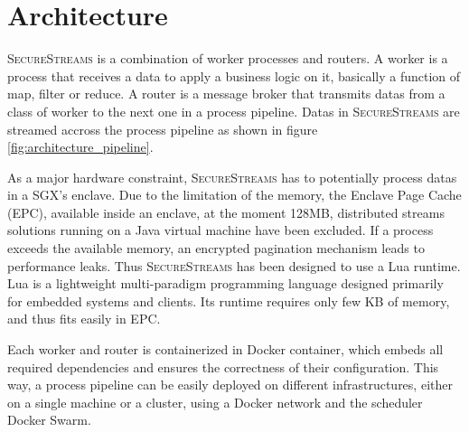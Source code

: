 \section{Architecture}
\label{sec:architecture}


\textsc{SecureStreams} is a combination of worker processes and routers.
A worker is a process that receives a data to apply a business logic on it, basically a function of map, filter or reduce.
A router is a message broker that transmits datas from a class of worker to the next one in a process pipeline.
Datas in \textsc{SecureStreams} are streamed accross the process pipeline as shown in figure \ref{fig:architecture_pipeline}.

As a major hardware constraint, \textsc{SecureStreams} has to potentially process datas in a SGX's enclave.
Due to the limitation of the memory, the Enclave Page Cache (EPC), available inside an enclave, at the moment 128MB, distributed streams solutions running on a Java virtual machine have been excluded.
If a process exceeds the available memory, an encrypted pagination mechanism leads to performance leaks.
Thus \textsc{SecureStreams} has been designed to use a Lua runtime.
Lua is a lightweight multi-paradigm programming language designed primarily for embedded systems and clients\cite{ierusalimschy_luaextensible_1996}.
Its runtime requires only few KB of memory, and thus fits easily in EPC.

Each worker and router is containerized in Docker container, which embeds all required dependencies and ensures the correctness of their configuration.
This way, a process pipeline can be easily deployed on different infrastructures, either on a single machine or a cluster, using a Docker network and the scheduler Docker Swarm\cite{docker:swarm_2016}.

